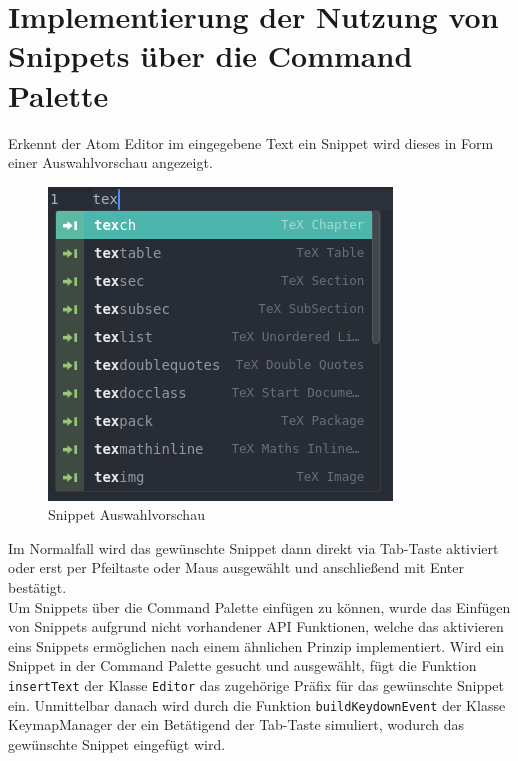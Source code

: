     \newpage
    \section{Implementierung der Nutzung von Snippets über die Command Palette}
        Erkennt der Atom Editor im eingegebene Text ein Snippet wird dieses in Form einer Auswahlvorschau angezeigt.
        \begin{figure}[H]
            \centering
            \includegraphics[scale=0.5]{img/snippet_preview.png}
            \caption{Snippet Auswahlvorschau}
        \end{figure}
        Im Normalfall wird das gewünschte Snippet dann direkt via Tab-Taste aktiviert oder erst per Pfeiltaste oder Maus ausgewählt und anschließend mit Enter bestätigt.
        \\
        Um Snippets über die Command Palette einfügen zu können, wurde das Einfügen von Snippets aufgrund nicht vorhandener API Funktionen, welche das aktivieren eins Snippets ermöglichen nach einem ähnlichen Prinzip implementiert. Wird ein Snippet in der Command Palette gesucht und ausgewählt, fügt die Funktion \texttt{insertText} der Klasse \texttt{Editor} das zugehörige Präfix für das gewünschte Snippet ein. Unmittelbar danach wird durch die Funktion \texttt{buildKeydownEvent} der Klasse KeymapManager der ein Betätigend der Tab-Taste simuliert, wodurch das gewünschte Snippet eingefügt wird.

